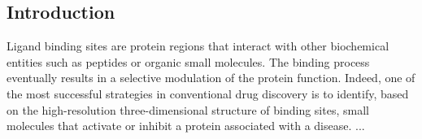 \subsection{Introduction}

Ligand binding sites are protein regions that interact with other biochemical entities such as peptides or organic small molecules. The binding process eventually results in a selective modulation of the protein function. Indeed, one of the most successful strategies in conventional drug discovery is to identify, based on the high-resolution three-dimensional structure of binding sites, small molecules that activate or inhibit a protein associated with a disease.  \cite{sadybekov_computational_2023}...

